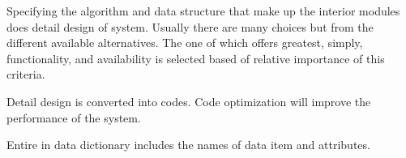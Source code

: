\documentclass{article} %
\begin{document}
\noindent \underbar{}

\noindent \underbar{}

\noindent 

\noindent \textbf{                                                       }

\noindent \textbf{}

\noindent \textbf{}

\noindent \textbf{}

\noindent \textbf{}

\noindent \textbf{}

\noindent \textbf{}

\noindent \textbf{}

\noindent \textbf{}

\noindent \textbf{}

\noindent \textbf{}

\noindent \textbf{}

\noindent \textbf{}

\noindent \textbf{}

\noindent \textbf{}

\noindent \textbf{}

\noindent \textbf{}

\noindent \textbf{}

\noindent \textbf{}

\noindent \textbf{                                                              }\underbar{}

\noindent \textbf{                    }\underbar{}

\noindent 

\noindent \textbf{}\underbar{}

\noindent Specifying the algorithm and data structure that make up the interior modules does detail design of system. Usually there are many choices but from the different available alternatives. The one of which offers greatest, simply, functionality, and availability is selected based of relative importance of this criteria. 

\noindent      Detail design is converted into codes. Code optimization will improve the performance of the system.

\noindent \textbf{}

\noindent 

\noindent Entire in data dictionary includes the names of data item and attributes. 
\end{document}
